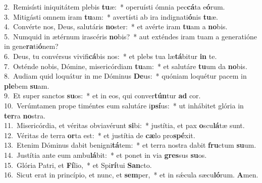 {2.~}Remisísti iniquitátem plebis \textbf{tu}æ:~* operuísti ómnia pec\textbf{cá}ta e\textbf{ó}rum.\\
{3.~}Mitigásti omnem iram \textbf{tu}am:~* avertísti ab ira indignati\textbf{ó}nis \textbf{tu}æ.\\
{4.~}Convérte nos, Deus, salutáris \textbf{no}ster:~* et avérte iram \textbf{tu}am a \textbf{no}bis.\\
{5.~}Numquid in ætérnum irascéris \textbf{no}bis?~* aut exténdes iram tuam a generatióne in gene\textbf{ra}ti\textbf{ó}nem?\\
{6.~}Deus, tu convérsus vivifi\textbf{cá}bis nos:~* et plebs tua læ\textbf{tá}bitur \textbf{in} te.\\
{7.~}Osténde nobis, Dómine, misericórdiam \textbf{tu}am:~* et salutáre \textbf{tu}um da \textbf{no}bis.\\
{8.~}Audiam quid loquátur in me Dóminus \textbf{De}us:~* quóniam loquétur pacem in \textbf{ple}bem \textbf{su}am.\\
{9.~}Et super sanctos \textbf{su}os:~* et in eos, qui conver\textbf{tún}tur \textbf{ad} cor.\\
{10.~}Verúmtamen prope timéntes eum salutáre i\textbf{psí}us:~* ut inhábitet glória in \textbf{ter}ra \textbf{no}stra.\\
{11.~}Misericórdia, et véritas obviavérunt \textbf{si}bi:~* justítia, et pax \textbf{o}scu\textbf{lá}tæ sunt.\\
{12.~}Véritas de terra \textbf{or}ta est:~* et justítia de \textbf{cæ}lo pro\textbf{spé}xit.\\
{13.~}Etenim Dóminus dabit benigni\textbf{tá}tem:~* et terra nostra dabit \textbf{fru}ctum \textbf{su}um.\\
{14.~}Justítia ante eum ambu\textbf{lá}bit:~* et ponet in via \textbf{gres}sus \textbf{su}os.\\
{15.~}Glória Patri, et \textbf{Fí}lio,~* et Spi\textbf{rí}tui \textbf{San}cto.\\
{16.~}Sicut erat in princípio, et nunc, et \textbf{sem}per,~* et in sǽcula sæcu\textbf{ló}rum. \textbf{A}men.\\
